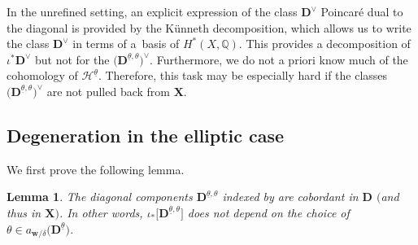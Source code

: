 \documentclass[pdftex]{sigma}
\newcommand{\btheta}{ {\underline{\theta}} }
\newcommand{\bfX}{ {\boldsymbol X} }
\newcommand{\bfD}{ {\boldsymbol D} }
\newcommand{\bfw}{ {\boldsymbol w} }
\renewcommand{\H}{\mathcal{H}}
\numberwithin{equation}{section}
\newtheorem{lem}[theo]{Lemma}
\theoremstyle{definition}
\begin{document}
In the unrefined setting, an explicit expression of the class $\bfD^\vee$ Poincar\'e dual to the diagonal is provided by the K\"unneth decomposition, which allows us to write the class $\bfD^\vee$ in terms of a~basis of $H^*(X,\mathbb Q)$. This provides a decomposition of $\iota^*\bfD^\vee$ but not for the $\bigl(\bfD^{\btheta,\theta}\bigr)^{\vee}$. Furthermore, we do not a priori know much of the cohomology of $\boldsymbol{\H}^\btheta$. Therefore, this task may be especially hard if the classes $\bigl(\bfD^{\btheta,\theta}\bigr)^{\vee}$ are not pulled back from $\mathbf{X}$. %

 \subsection{Degeneration in the elliptic case}
We first prove the following lemma.


\begin{lem}\label{lem-cobordant-components}
 The diagonal components $\bfD^{\btheta,\theta}$ indexed by \smash{$\theta\in a_{\bfw/\delta}\bigl(\bfD^\btheta\bigr)$} are cobordant in $\bfD$ $($and thus in $\bfX)$. In other words, $\iota_*\big[\bfD^{\btheta,\theta}\big]$ does not depend on the choice of $\theta\in a_{\bfw/\delta}\bigl(\bfD^\btheta\bigr)$.
\end{lem}
\end{document}
